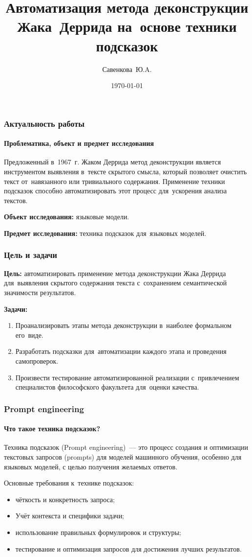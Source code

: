 \documentclass{beamer}
\title{Автоматизация метода деконструкции Жака~Деррида на~основе техники подсказок}
\author{Савенкова~Ю.A.}
\date{\today}
\begin{document}
\maketitle

\begin{frame}
\frametitle{Актуальность работы}
\framesubtitle{Проблематика, объект и предмет исследования}

Предложенный в~1967~г. Жаком Деррида метод деконструкции является инструментом выявления в~тексте скрытого смысла,
который позволяет очистить текст от~навязанного или тривиального содержания.
Применение техники подсказок способно автоматизировать этот процесс для~ускорения анализа текстов.

{\bf Объект исследования:} языковые модели.

{\bf Предмет исследования:} техника подсказок для~языковых моделей.
\end{frame}

\begin{frame}
\frametitle{Цель и задачи}

{\bf Цель: } автоматизировать применение метода деконструкции Жака Деррида для~выявления скрытого содержания текста
с~сохранением семантической значимости результатов.

{\bf Задачи:}

\begin{enumerate}
\item{Проанализировать этапы метода деконструкции в~наиболее формальном его~виде.}
\item{Разработать подсказки для~автоматизации каждого этапа и проведения самопроверок.}
\item{Произвести тестирование  автоматизированной реализации с~привлечением специалистов философского факультета для~оценки качества.}
\end{enumerate}
\end{frame}

\begin{frame}
\frametitle{Prompt engineering}
\framesubtitle{Что такое техника подсказок?}

Техника подсказок (Prompt engineering)~--- это процесс создания и оптимизации текстовых запросов (prompts) для моделей машинного обучения, особенно для языковых моделей, с целью получения желаемых ответов.

Основные требования к~технике подсказок:

\begin{itemize}
\item{чёткость и конкретность запроса;}
\item{Учёт контекста и специфики задачи;}
\item{использование правильных формулировок и структуры;}
\item{тестирование и оптимизация запросов для достижения лучших результатов.}
\end{itemize}
\end{frame}
\end{document}
